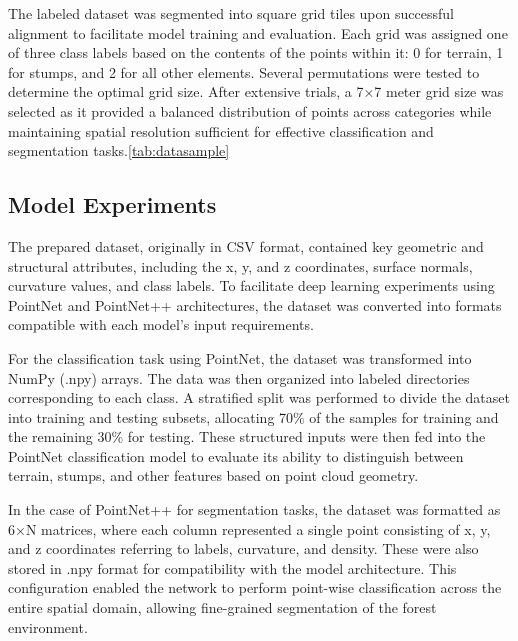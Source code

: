 \documentclass[../report.tex]{subfiles}
\begin{document}
    The labeled dataset was segmented into square grid tiles upon successful alignment to facilitate model training and evaluation. Each grid was assigned one of three class labels based on the contents of the points within it: 0 for terrain, 1 for stumps, and 2 for all other elements. Several permutations were tested to determine the optimal grid size. After extensive trials, a 7×7 meter grid size was selected as it provided a balanced distribution of points across categories while maintaining spatial resolution sufficient for effective classification and segmentation tasks.\ref{tab:datasample}
    
	\subsection{Model Experiments}
    The prepared dataset, originally in CSV format, contained key geometric and structural attributes, including the x, y, and z coordinates, surface normals, curvature values, and class labels. To facilitate deep learning experiments using PointNet and PointNet++ architectures, the dataset was converted into formats compatible with each model’s input requirements.

    For the classification task using PointNet, the dataset was transformed into NumPy (.npy) arrays. The data was then organized into labeled directories corresponding to each class. A stratified split was performed to divide the dataset into training and testing subsets, allocating 70\% of the samples for training and the remaining 30\% for testing. These structured inputs were then fed into the PointNet classification model to evaluate its ability to distinguish between terrain, stumps, and other features based on point cloud geometry.
    
    In the case of PointNet++ for segmentation tasks, the dataset was formatted as 6×N matrices, where each column represented a single point consisting of x, y, and z coordinates referring to labels, curvature, and density. These were also stored in .npy format for compatibility with the model architecture. This configuration enabled the network to perform point-wise classification across the entire spatial domain, allowing fine-grained segmentation of the forest environment.
    
\end{document}
